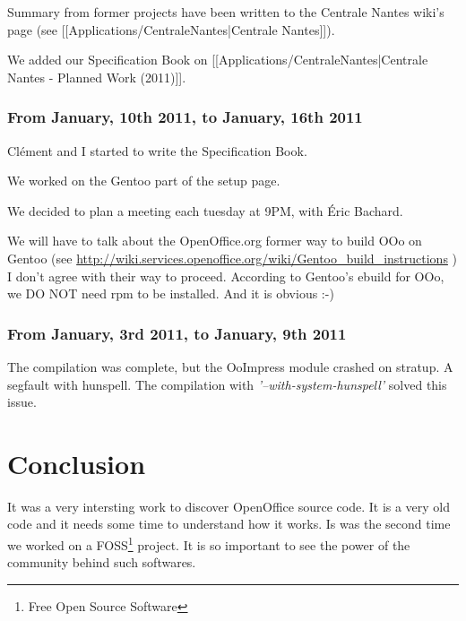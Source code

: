 \documentclass[a4paper,11pt]{article}
\begin{document}
Summary from former projects have been written to the Centrale Nantes wiki's page (see [[Applications/CentraleNantes|Centrale Nantes]]).

We added our Specification Book on [[Applications/CentraleNantes|Centrale Nantes - Planned Work (2011)]].

\subsubsection*{From January, 10th 2011, to January, 16th 2011}

Clément and I started to write the Specification Book.

We worked on the Gentoo part of the setup page.

We decided to plan a meeting each tuesday at 9PM, with Éric Bachard.

We will have to talk about the OpenOffice.org former way to build OOo on Gentoo (see \url{http://wiki.services.openoffice.org/wiki/Gentoo_build_instructions} )
I don't agree with their way to proceed. According to Gentoo's ebuild for OOo, we DO NOT need rpm to be installed. And it is obvious :-)

\subsubsection*{From January, 3rd 2011, to January, 9th 2011}

The compilation was complete, but the OoImpress module crashed on stratup. A segfault with hunspell.
The compilation with \emph{'--with-system-hunspell'} solved this issue.


\newpage
{}
\section*{Conclusion}

It was a very intersting work to discover OpenOffice source code. It is a very old code and it needs some time to understand how it works. Is was the second time we worked on a FOSS\footnote{Free Open Source Software} project. It is so important to see the power of the community behind such softwares. 
\end{document}
